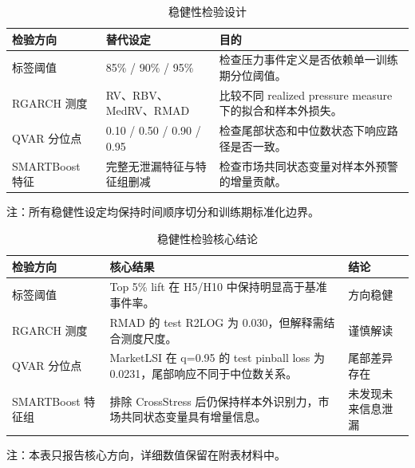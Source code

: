 \begin{table}[H]
\centering
\caption{稳健性检验设计}
\label{tab:robustness-design}
\small
\begin{threeparttable}
\begin{tabularx}{\textwidth}{p{}p{}Y}
\toprule
检验方向 & 替代设定 & 目的 \\
\midrule
标签阈值 & 85\% / 90\% / 95\% & 检查压力事件定义是否依赖单一训练期分位阈值。 \\
RGARCH 测度 & RV、RBV、MedRV、RMAD & 比较不同 realized pressure measure 下的拟合和样本外损失。 \\
QVAR 分位点 & 0.10 / 0.50 / 0.90 / 0.95 & 检查尾部状态和中位数状态下响应路径是否一致。 \\
SMARTBoost 特征 & 完整无泄漏特征与特征组删减 & 检查市场共同状态变量对样本外预警的增量贡献。 \\
\bottomrule
\end{tabularx}
\begin{tablenotes}[flushleft]
\footnotesize
\item 注：所有稳健性设定均保持时间顺序切分和训练期标准化边界。
\end{tablenotes}
\end{threeparttable}
\end{table}

\begin{table}[H]
\centering
\caption{稳健性检验核心结论}
\label{tab:robustness-conclusions}
\small
\begin{threeparttable}
\begin{tabularx}{\textwidth}{p{}Y p{0.18\textwidth}}
\toprule
检验方向 & 核心结果 & 结论 \\
\midrule
标签阈值 & Top 5\% lift 在 H5/H10 中保持明显高于基准事件率。 & 方向稳健 \\
RGARCH 测度 & RMAD 的 test R2LOG 为 0.030，但解释需结合测度尺度。 & 谨慎解读 \\
QVAR 分位点 & MarketLSI 在 q=0.95 的 test pinball loss 为 0.0231，尾部响应不同于中位数关系。 & 尾部差异存在 \\
SMARTBoost 特征组 & 排除 CrossStress 后仍保持样本外识别力，市场共同状态变量具有增量信息。 & 未发现未来信息泄漏 \\
\bottomrule
\end{tabularx}
\begin{tablenotes}[flushleft]
\footnotesize
\item 注：本表只报告核心方向，详细数值保留在附表材料中。
\end{tablenotes}
\end{threeparttable}
\end{table}
